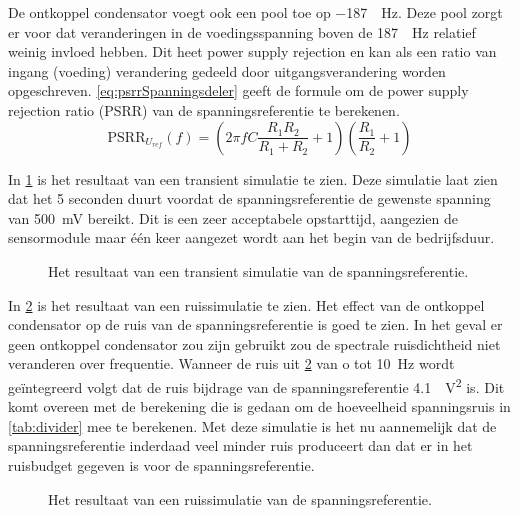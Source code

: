De ontkoppel condensator voegt ook een pool toe op \qty{-187}{\milli.\hertz}. Deze pool zorgt er voor dat veranderingen in de voedingsspanning boven de \qty{187}{\milli.\hertz} relatief weinig invloed hebben. Dit heet power supply rejection en kan als een ratio van ingang (voeding) verandering gedeeld door uitgangsverandering worden opgeschreven. \cref{eq:psrrSpanningsdeler} geeft de formule om de power supply rejection ratio (PSRR) van de spanningsreferentie te berekenen.
\begin{equation}\label{eq:psrrSpanningsdeler}
    \mathrm{PSRR}_{U_{ref}}\left(f\right)=\left(2\pi fC\frac{R_1R_2}{R_1+R_2}+1\right)\left(\frac{R_1}{R_2}+1\right)
\end{equation}

In \cref{fig:referenceSimTrans} is het resultaat van een transient simulatie te zien. Deze simulatie laat zien dat het 5 seconden duurt voordat de spanningsreferentie de gewenste spanning van \qty{500}{\milli\volt} bereikt. Dit is een zeer acceptabele opstarttijd, aangezien de sensormodule maar één keer aangezet wordt aan het begin van de bedrijfsduur.
\begin{figure}[!htbp]
    \centering
    \pgfplotsset{width=0.7\textwidth}
    
    \caption{Het resultaat van een transient simulatie van de spanningsreferentie.}
    \label{fig:referenceSimTrans}
\end{figure}

In \cref{fig:referenceSimNoise} is het resultaat van een ruissimulatie te zien. Het effect van de ontkoppel condensator op de ruis van de spanningsreferentie is goed te zien. In het geval er geen ontkoppel condensator zou zijn gebruikt zou de spectrale ruisdichtheid niet veranderen over frequentie. Wanneer de ruis uit \cref{fig:referenceSimNoise} van o tot \qty{10}{\hertz} wordt geïntegreerd volgt dat de ruis bijdrage van de spanningsreferentie \qty{4.1}{\femto.\volt^2} is. Dit komt overeen met de berekening die is gedaan om de hoeveelheid spanningsruis in \cref{tab:divider} mee te berekenen. Met deze simulatie is het nu aannemelijk dat de spanningsreferentie inderdaad veel minder ruis produceert dan dat er in het ruisbudget gegeven is voor de spanningsreferentie.
\begin{figure}[!htbp]
    \centering
    \pgfplotsset{width=0.7\textwidth}
    
    \caption{Het resultaat van een ruissimulatie van de spanningsreferentie.}
    \label{fig:referenceSimNoise}
\end{figure}


